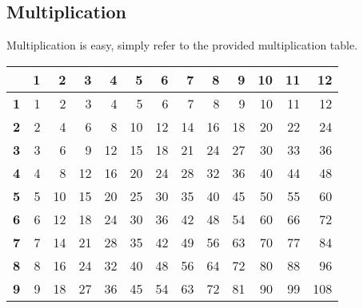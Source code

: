 \documentclass[a4paper]{article}
\theoremstyle{plain}
\theoremstyle{definition}
\theoremstyle{remark}
\begin{document}
    \subsection{Multiplication}
    Multiplication is easy, simply refer to the provided multiplication table.
    \begin{table}[H]
        \centering
        \begin{tabular}{r|rrrrrrrrrrrr}
                    & \textbf{1} & \textbf{2} & \textbf{3} & \textbf{4} & \textbf{5} & \textbf{6} & \textbf{7} & \textbf{8} & \textbf{9} & \textbf{10} & \textbf{11} & \textbf{12} \\ \hline
        \textbf{1}  & 1          & 2          & 3          & 4          & 5          & 6          & 7          & 8          & 9          & 10          & 11          & 12          \\
        \textbf{2}  & 2          & 4          & 6          & 8          & 10         & 12         & 14         & 16         & 18         & 20          & 22          & 24          \\
        \textbf{3}  & 3          & 6          & 9          & 12         & 15         & 18         & 21         & 24         & 27         & 30          & 33          & 36          \\
        \textbf{4}  & 4          & 8          & 12         & 16         & 20         & 24         & 28         & 32         & 36         & 40          & 44          & 48          \\
        \textbf{5}  & 5          & 10         & 15         & 20         & 25         & 30         & 35         & 40         & 45         & 50          & 55          & 60          \\
        \textbf{6}  & 6          & 12         & 18         & 24         & 30         & 36         & 42         & 48         & 54         & 60          & 66          & 72          \\
        \textbf{7}  & 7          & 14         & 21         & 28         & 35         & 42         & 49         & 56         & 63         & 70          & 77          & 84          \\
        \textbf{8}  & 8          & 16         & 24         & 32         & 40         & 48         & 56         & 64         & 72         & 80          & 88          & 96          \\
        \textbf{9}  & 9          & 18         & 27         & 36         & 45         & 54         & 63         & 72         & 81         & 90          & 99          & 108         \\

\end{tabular}
\end{table}
\end{document}
